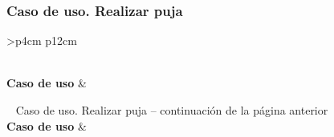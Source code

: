 \subsubsection{Caso de uso. Realizar puja} \label{sec:cu_realizar-puja}
\begin{longtable}{
    >{}p{4cm}
    p{12cm}
    }
    \caption{Caso de uso. Realizar puja} \label{table:cu_realizar-puja} \\
    \toprule
    \textbf{Caso de uso} &  \\
    \endfirsthead
    
    {{ \tablename\ \thetable{} Caso de uso. Realizar puja -- continuación de la página anterior}} \\
    \toprule
    \textbf{Caso de uso} &  \\
    \midrule
    \endhead
    
    \midrule
     \\ 
    \endfoot
    
    \bottomrule
    \endlastfoot
    

\end{longtable}
